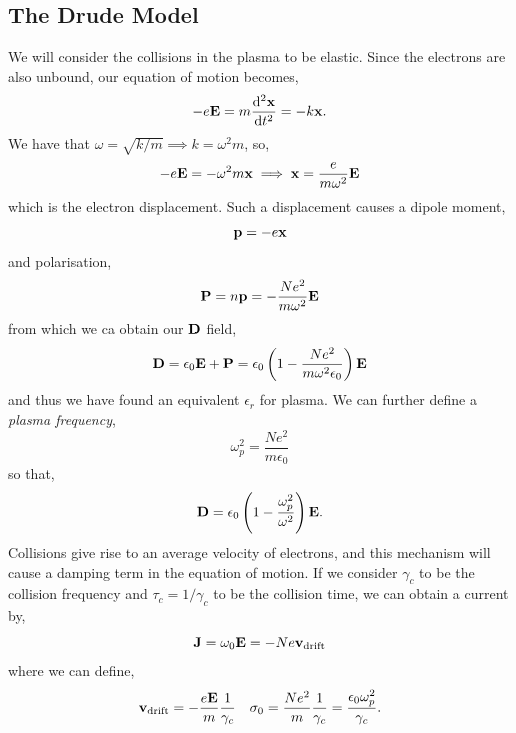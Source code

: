 \documentclass{book}
\begin{document}
\subsection{The Drude Model}
We will consider the collisions in the plasma to be elastic. Since the electrons are also unbound, our equation of motion becomes,
\begin{equation}
	-e\vb{E} = m\dv[2]{\vb{x}}{t} = -k\vb{x}.
\end{equation}
We have that $\omega = \sqrt{k/m} \implies k = \omega^2m$, so,
\begin{equation}
	-e\vb{E} = -\omega^2m\vb{x} \implies \vb{x} = \frac{e}{m\omega^2}\vb{E}
\end{equation}
which is the electron displacement. Such a displacement causes a dipole moment,
\begin{equation}
	\vb{p} = - e\vb{x}
\end{equation}
and polarisation,
\begin{equation}
	\vb{P} = n\vb{p} = -\frac{Ne^2}{m\omega^2}\vb{E}
\end{equation}
from which we ca obtain our $\vb{D}$ field,
\begin{equation}
	\vb{D} = \epsilon_0\vb{E} + \vb{P} = \epsilon_0\left(1 - \frac{Ne^2}{m\omega^2\epsilon_0}\right)\vb{E}
\end{equation}
and thus we have found an equivalent $\epsilon_r$ for plasma. We can further define a \textit{plasma frequency},
\begin{equation}
	\omega_p^2 = \frac{Ne^2}{m\epsilon_0}
\end{equation}
so that,
\begin{equation}
	\vb{D} = \epsilon_0\left(1-\frac{\omega_p^2}{\omega^2}\right)\vb{E}.
\end{equation}
Collisions give rise to an average velocity of electrons, and this mechanism will cause a damping term in the equation of motion. If we consider $\gamma_c$ to be the collision frequency and $\tau_c = 1/\gamma_c$ to be the collision time, we can obtain a current by,
\begin{equation}
	\vb{J} = \omega_0 \vb{E} = -Ne\vb{v}_{\text{drift}}
\end{equation}
where we can define,
\begin{align}
	\vb{v}_{\text{drift}} = -\frac{e\vb{E}}{m}\frac{1}{\gamma_c} && \sigma_0 = \frac{Ne^2}{m}\frac{1}{\gamma_c} = \frac{\epsilon_0\omega_p^2}{\gamma_c}.
\end{align}
\end{document}
